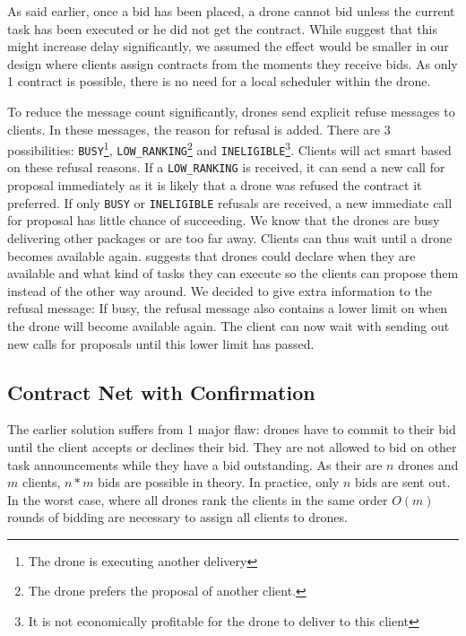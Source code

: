 \documentclass[10pt,a4paper]{article}
\begin{document}
As said earlier, once a bid has been placed, a drone cannot bid unless the current task has been executed or he did not get the contract. While \cite{CNET} suggest that this might increase delay significantly, we assumed the effect would be smaller in our design where clients assign contracts from the moments they receive bids. As only 1 contract is possible, there is no need for a local scheduler within the drone.

To reduce the message count significantly, drones send explicit refuse messages to clients. In these messages, the reason for refusal is added. There are 3 possibilities: \texttt{BUSY}\footnote{The drone is executing another delivery}, \texttt{LOW\_RANKING}\footnote{The drone prefers the proposal of another client.} and \texttt{INELIGIBLE}\footnote{It is not economically profitable for the drone to deliver to this client}. Clients will act smart based on these refusal reasons. If a \texttt{LOW\_RANKING} is received, it can send a new call for proposal immediately as it is likely that a drone was refused the contract it preferred. If only \texttt{BUSY} or \texttt{INELIGIBLE} refusals are received, a new immediate call for proposal has little chance of succeeding. We know that the drones are busy delivering other packages or are too far away. Clients can thus wait until a drone becomes available again. \cite{CNET} suggests that drones could declare when they are available and what kind of tasks they can execute so the clients can propose them instead of the other way around. We decided to give extra information to the refusal message: If busy, the refusal message also contains a lower limit on when the drone will become available again. The client can now wait with sending out new calls for proposals until this lower limit has passed.

\subsection{Contract Net with Confirmation} The earlier solution suffers from 1 major flaw: drones have to commit to their bid until the client accepts or declines their bid. They are not allowed to bid on other task announcements while they have a bid outstanding. As their are $n$ drones and $m$ clients, $n*m$ bids are possible in theory. In practice, only $n$ bids are sent out. In the worst case, where all drones rank the clients in the same order $O(m)$ rounds of bidding are necessary to assign all clients to drones.
\end{document}
